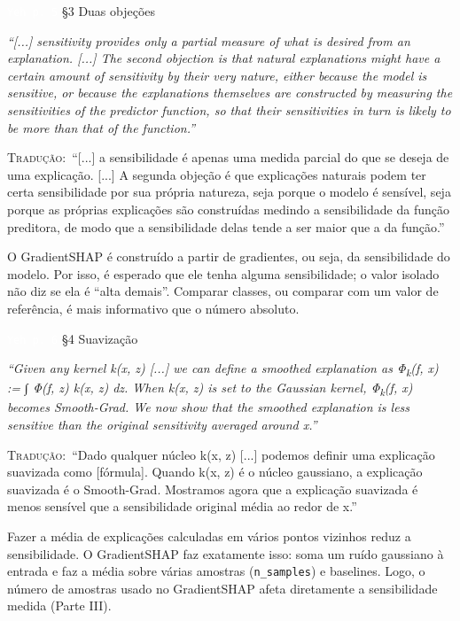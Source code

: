 \documentclass[11pt,a4paper]{article}
\newcommand{\pagechip}[1]{{\setlength{\fboxsep}{1.5pt}\colorbox{cAcc}{\textcolor{white}{\scriptsize\texttt{#1}}}}}
\newenvironment{origquote}{\par\itshape\small}{\par}
\newenvironment{tradquote}{\par\small\textsc{Tradução:}\ }{\par}
\newcommand{\explab}[1]{\par\smallskip{\small\color{cAcc}\textbf{\MakeUppercase{#1}}}\par}
\begin{document}
\begin{citacard}{\pagechip{Yeh p. 5} §3 Duas objeções}
\begin{origquote}“[...] sensitivity provides only a partial measure of what is desired from an explanation. [...] The second objection is that natural explanations might have a certain amount of sensitivity by their very nature, either because the model is sensitive, or because the explanations themselves are constructed by measuring the sensitivities of the predictor function, so that their sensitivities in turn is likely to be more than that of the function.”\end{origquote}
\begin{tradquote}“[...] a sensibilidade é apenas uma medida parcial do que se deseja de uma explicação. [...] A segunda objeção é que explicações naturais podem ter certa sensibilidade por sua própria natureza, seja porque o modelo é sensível, seja porque as próprias explicações são construídas medindo a sensibilidade da função preditora, de modo que a sensibilidade delas tende a ser maior que a da função.”\end{tradquote}
\explab{Explicação}
O GradientSHAP é construído a partir de gradientes, ou seja, da sensibilidade do modelo. Por isso, é esperado que ele tenha alguma sensibilidade; o valor isolado não diz se ela é “alta demais”. Comparar classes, ou comparar com um valor de referência, é mais informativo que o número absoluto.
\end{citacard}

\begin{citacard}{\pagechip{Yeh p. 6} §4 Suavização}
\begin{origquote}“Given any kernel k(x, z) [...] we can define a smoothed explanation as Φ\textsubscript{k}(f, x) := ∫ Φ(f, z) k(x, z) dz. When k(x, z) is set to the Gaussian kernel, Φ\textsubscript{k}(f, x) becomes Smooth-Grad. We now show that the smoothed explanation is less sensitive than the original sensitivity averaged around x.”\end{origquote}
\begin{tradquote}“Dado qualquer núcleo k(x, z) [...] podemos definir uma explicação suavizada como [fórmula]. Quando k(x, z) é o núcleo gaussiano, a explicação suavizada é o Smooth-Grad. Mostramos agora que a explicação suavizada é menos sensível que a sensibilidade original média ao redor de x.”\end{tradquote}
\explab{Explicação}
Fazer a média de explicações calculadas em vários pontos vizinhos reduz a sensibilidade. O GradientSHAP faz exatamente isso: soma um ruído gaussiano à entrada e faz a média sobre várias amostras (\texttt{n\_samples}) e baselines. Logo, o número de amostras usado no GradientSHAP afeta diretamente a sensibilidade medida (Parte III).
\end{citacard}
\end{document}

